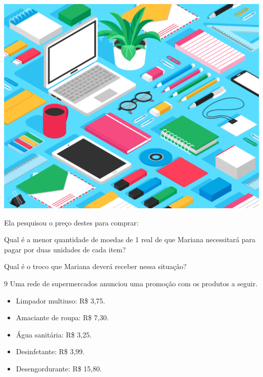 \begin{center}
\includegraphics[width=\textwidth]{media/image37d.jpeg}
\end{center}

Ela pesquisou o preço destes para comprar:


\begin{escolha}
\item
  Qual é a menor quantidade de moedas de 1 real de que Mariana necessitará para
  pagar por duas unidades de cada item?\\

\item
  Qual é o troco que Mariana deverá receber nessa situação?\\
\end{escolha}

\num{9} Uma rede de supermercados anunciou uma promoção com os produtos a seguir.

\begin{mdframed}[linewidth=2pt,linecolor=azul!20,backgroundcolor=azul!20,roundcorner=2pt]
\begin{itemize}
  \item Limpador multiuso: R\$ 3,75.
  \item Amaciante de roupa: R\$ 7,30.
  \item Água sanitária: R\$ 3,25.
  \item Desinfetante: R\$ 3,99.
  \item Desengordurante: R\$ 15,80.
\end{itemize}
\end{mdframed}

